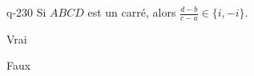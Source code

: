 \begin{truefalse}{q-230}
Si $ABCD$ est un carré, alors $\frac{d-b}{c-a} \in\{i,-i\}$.
\item* Vrai
\item Faux
\end{truefalse}

